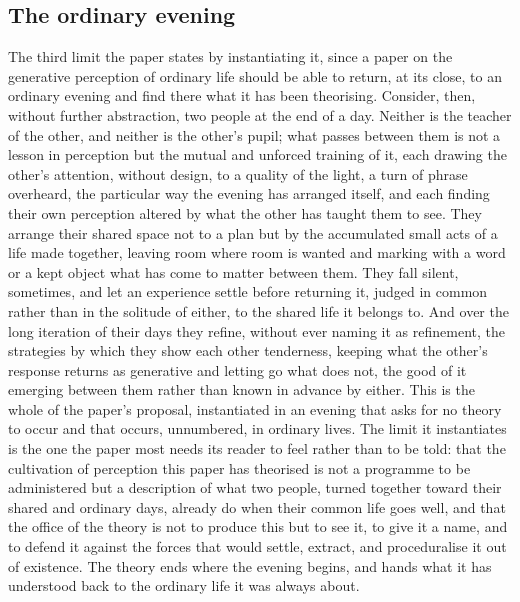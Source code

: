 \subsection{The ordinary evening}
\label{p23:sub:limits-instantiation}

The third limit the paper states by instantiating it, since a paper on the generative perception of ordinary life should be able to return, at its close, to an ordinary evening and find there what it has been theorising. Consider, then, without further abstraction, two people at the end of a day. Neither is the teacher of the other, and neither is the other's pupil; what passes between them is not a lesson in perception but the mutual and unforced training of it, each drawing the other's attention, without design, to a quality of the light, a turn of phrase overheard, the particular way the evening has arranged itself, and each finding their own perception altered by what the other has taught them to see. They arrange their shared space not to a plan but by the accumulated small acts of a life made together, leaving room where room is wanted and marking with a word or a kept object what has come to matter between them. They fall silent, sometimes, and let an experience settle before returning it, judged in common rather than in the solitude of either, to the shared life it belongs to. And over the long iteration of their days they refine, without ever naming it as refinement, the strategies by which they show each other tenderness, keeping what the other's response returns as generative and letting go what does not, the good of it emerging between them rather than known in advance by either. This is the whole of the paper's proposal, instantiated in an evening that asks for no theory to occur and that occurs, unnumbered, in ordinary lives. The limit it instantiates is the one the paper most needs its reader to feel rather than to be told: that the cultivation of perception this paper has theorised is not a programme to be administered but a description of what two people, turned together toward their shared and ordinary days, already do when their common life goes well, and that the office of the theory is not to produce this but to see it, to give it a name, and to defend it against the forces that would settle, extract, and proceduralise it out of existence. The theory ends where the evening begins, and hands what it has understood back to the ordinary life it was always about.
